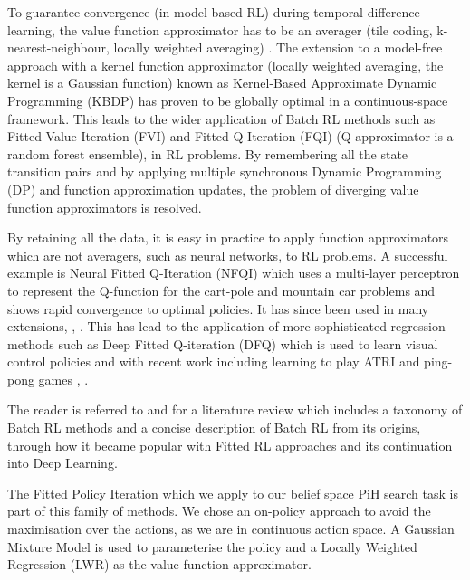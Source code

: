 \documentclass[final,5p,times,twocolumn]{elsarticle}
\begin{document}
To guarantee convergence (in model based RL) during temporal difference learning, 
the value function approximator has to be an averager (tile coding, k-nearest-neighbour, locally weighted averaging) 
\cite{stable_FA_gordon_1995}. The extension to a model-free approach with a kernel function approximator 
(locally weighted averaging, the kernel is a Gaussian function) known as Kernel-Based Approximate Dynamic Programming (KBDP) \cite{kernel_rl_ormoneit_2002}
has proven to be globally optimal in a continuous-space framework. This leads to the wider application of Batch RL methods 
such as Fitted Value Iteration (FVI) \cite{fvi_uav_2010} and Fitted Q-Iteration (FQI) \cite{EGW05} (Q-approximator is a random forest ensemble),
\cite{fqi_nips_peter_2009} in RL problems. By remembering all the state transition pairs and by applying multiple 
synchronous Dynamic Programming (DP) and function approximation updates, the problem of diverging value function approximators is resolved. 

By retaining all the data, it is easy in practice to apply function approximators which are not averagers, such as neural networks,
to RL problems. A successful example is Neural Fitted Q-Iteration (NFQI) \cite{Riedmiller2005} which 
uses a multi-layer perceptron to represent the Q-function for the cart-pole and mountain car problems and 
shows rapid convergence to optimal policies. It has since been used in many extensions, \cite{NAC_2008}, \cite{rl_gmm_2010}.
This has lead to the application of more sophisticated regression methods such as 
Deep Fitted Q-iteration (DFQ) \cite{Lange_riedmiller_2010} which is used to learn visual control policies
and with recent work including learning to play ATRI and ping-pong games \cite{mnih-dqn-2015}, \cite{DRQ_AAAI_2015}. 

The reader is referred to \cite{approx_rl_overview_2011} and \cite[Chap 2]{RL_state_art_2012} for a literature 
review which includes a taxonomy of Batch RL methods and a concise description of Batch RL from its origins, 
through how it became popular with Fitted RL approaches and its continuation into Deep Learning.

The Fitted Policy Iteration which we apply to our belief space PiH search task is part of this family of methods.
We chose an on-policy approach to avoid the maximisation over the actions, as we are in continuous action space.
A Gaussian Mixture Model is used to parameterise the policy and a Locally Weighted Regression (LWR) as 
the value function approximator.
\end{document}
